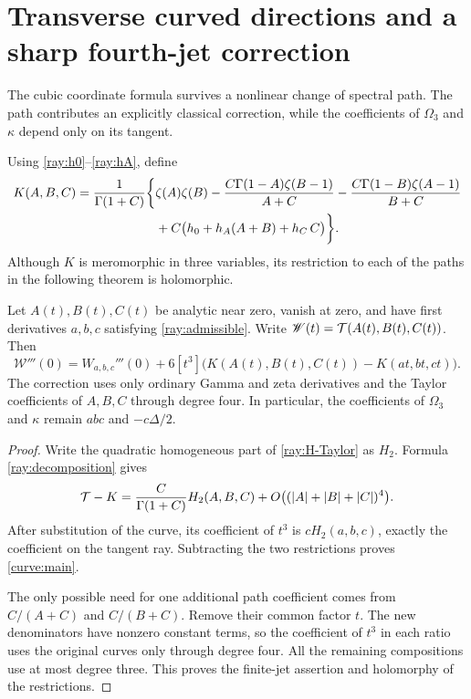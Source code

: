 \section{Transverse curved directions and a sharp fourth-jet correction}
\label{sec:curves}

The cubic coordinate formula survives a nonlinear change of spectral
path. The path contributes an explicitly classical correction, while
the coefficients of $\Omega_3$ and $\kappa$ depend only on its tangent.

Using \eqref{ray:h0}--\eqref{ray:hA}, define
\begin{align}
 K(A,B,C)=\frac1{\Gamma(1+C)}\biggl\{
 &\zeta(A)\zeta(B)
 -\frac{C\Gamma(1-A)\zeta(B-1)}{A+C}
 -\frac{C\Gamma(1-B)\zeta(A-1)}{B+C}\notag\\
 &+C\bigl(h_0+h_A(A+B)+h_C\,C\bigr)\biggr\}.
 \label{curve:K}
\end{align}
Although $K$ is meromorphic in three variables, its restriction to
each of the paths in the following theorem is holomorphic.

\begin{theorem}\label{thm:curve}
Let $A(t),B(t),C(t)$ be analytic near zero, vanish at zero, and have
first derivatives $a,b,c$ satisfying \eqref{ray:admissible}.
Write $\mathscr W(t)=\mathcal T(A(t),B(t),C(t))$. Then
\begin{equation}\label{curve:main}
 \mathscr W'''(0)=W_{a,b,c}'''(0)+
 6[t^3]\bigl(K(A(t),B(t),C(t))-K(at,bt,ct)\bigr).
\end{equation}
The correction uses only ordinary Gamma and zeta derivatives and
the Taylor coefficients of $A,B,C$ through degree four. In particular,
the coefficients of $\Omega_3$ and $\kappa$ remain $abc$ and
$-c\Delta/2$.
\end{theorem}

\begin{proof}
Write the quadratic homogeneous part of \eqref{ray:H-Taylor} as
$H_2$. Formula \eqref{ray:decomposition} gives
\[
 \mathcal T-K=\frac{C}{\Gamma(1+C)}H_2(A,B,C)
            +O\bigl((|A|+|B|+|C|)^4\bigr).
\]
After substitution of the curve, its coefficient of $t^3$ is
$cH_2(a,b,c)$, exactly the coefficient on the tangent ray. Subtracting
the two restrictions proves \eqref{curve:main}.

The only possible need for one additional path coefficient comes
from $C/(A+C)$ and $C/(B+C)$. Remove their common factor $t$.
The new denominators have nonzero constant terms, so the coefficient
of $t^3$ in each ratio uses the original curves only through degree
four. All the remaining compositions use at most degree three.
This proves the finite-jet assertion and holomorphy of the restrictions.
\end{proof}


